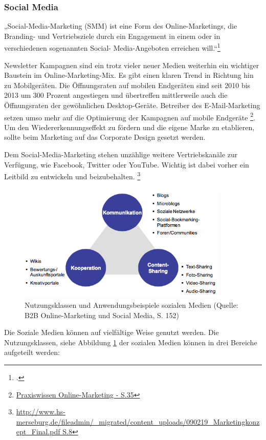 \subsubsection{Social Media}
„Social-Media-Marketing (SMM) ist eine Form des Online-Marketings, die Branding- und Vertriebsziele durch ein Engagement in einem oder in verschiedenen sogenannten Social- Media-Angeboten erreichen will.“\footcite[Vgl.][31]{lammenett_2014}

Newsletter Kampagnen sind ein trotz vieler neuer Medien weiterhin ein wichtiger Baustein im Online-Marketing-Mix. Es gibt einen klaren Trend in Richtung hin zu Mobilgeräten. Die Öffnungsraten auf mobilen Endgeräten sind seit 2010 bis 2013 um 300 Prozent angestiegen und übertreffen mittlerweile auch die Öffnungsraten der gewöhnlichen Desktop-Geräte. Betreiber des E-Mail-Marketing setzen umso mehr auf die Optimierung der Kampagnen auf mobile Endgeräte \footnote{\url{Praxiswissen Online-Marketing - S.35}}. Um den Wiedererkennungseffekt zu fördern und die eigene Marke zu etablieren, sollte beim Marketing auf das Corporate Design gesetzt werden.

Dem Social-Media-Marketing stehen unzählige weitere Vertriebskanäle zur Verfügung, wie Facebook, Twitter oder YouTube. Wichtig ist dabei vorher ein Leitbild zu entwickeln und beizubehalten. \footnote{\url{http://www.hs-merseburg.de/fileadmin/_migrated/content_uploads/090219_Marketingkonzept_Final.pdf S.8}}

\begin{figure}[h!]
	\centering
	\includegraphics[width=10cm]{kapitel/gruppe1_2/bilder/nutzungsklassen}
	\caption{Nutzungsklassen und Anwendungsbeispiele sozialen Medien (Quelle: B2B Online-Marketing und Social Media, S. 152)}
	\label{fig_nutzungsklassen}
\end{figure}

Die Soziale Medien können auf vielfältige Weise genutzt werden. Die Nutzungsklassen, siehe Abbildung \ref{fig_nutzungsklassen} der sozialen Medien können in drei Bereiche aufgeteilt werden:


